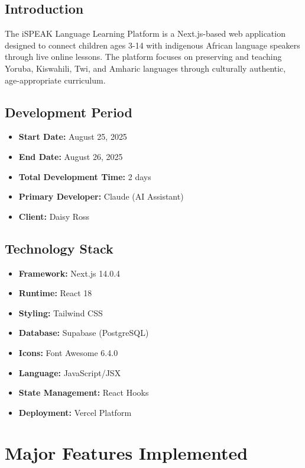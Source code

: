 \documentclass[11pt,a4paper]{article}
\begin{document}
\subsection{Introduction}
The iSPEAK Language Learning Platform is a Next.js-based web application designed to connect children ages 3-14 with indigenous African language speakers through live online lessons. The platform focuses on preserving and teaching Yoruba, Kiswahili, Twi, and Amharic languages through culturally authentic, age-appropriate curriculum.

\subsection{Development Period}
\begin{itemize}[leftmargin=*,itemsep=5pt]
    \item \textbf{Start Date:} August 25, 2025
    \item \textbf{End Date:} August 26, 2025
    \item \textbf{Total Development Time:} 2 days
    \item \textbf{Primary Developer:} Claude (AI Assistant)
    \item \textbf{Client:} Daisy Ross
\end{itemize}

\subsection{Technology Stack}
\begin{multicols}{2}
\begin{itemize}[leftmargin=*,itemsep=3pt]
    \item \textbf{Framework:} Next.js 14.0.4
    \item \textbf{Runtime:} React 18
    \item \textbf{Styling:} Tailwind CSS
    \item \textbf{Database:} Supabase (PostgreSQL)
    \item \textbf{Icons:} Font Awesome 6.4.0
    \item \textbf{Language:} JavaScript/JSX
    \item \textbf{State Management:} React Hooks
    \item \textbf{Deployment:} Vercel Platform
\end{itemize}
\end{multicols}

\section{Major Features Implemented}
\end{document}
